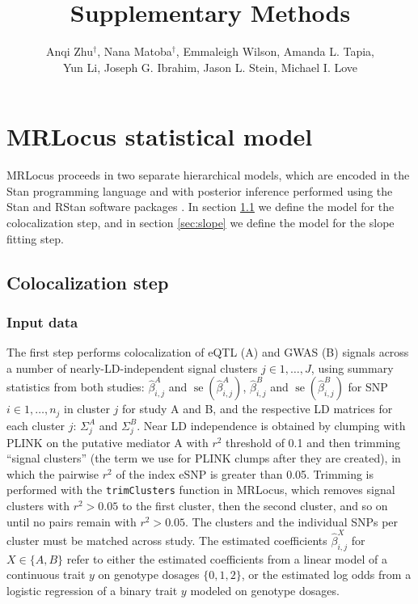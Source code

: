 \documentclass[11pt]{article}
\title{Supplementary Methods}
\author{Anqi Zhu$^\dagger$, Nana Matoba$^\dagger$, Emmaleigh Wilson, Amanda L. Tapia,
  \\ Yun Li, Joseph G. Ibrahim, Jason L. Stein, Michael I. Love}
\DeclareMathOperator{\se}{\textrm{se}}
\begin{document}
\maketitle
\section{MRLocus statistical model}

MRLocus proceeds in two separate hierarchical models, which are
encoded in the Stan programming language and with posterior
inference performed using the Stan and RStan software packages
\citep{stan,rstan}. In section \ref{sec:coloc} we define the
model for the colocalization step, and in section \ref{sec:slope} we
define the model for the slope fitting step.

\subsection{Colocalization step} \label{sec:coloc}

\subsubsection{Input data} \label{sec:input}

The first step performs colocalization of eQTL (A) and GWAS (B)
signals across a number of nearly-LD-independent signal clusters
$j \in 1,\dots,J$, using summary statistics from both studies:
$\widehat{\beta}^A_{i,j}$ and $\se(\widehat{\beta}^A_{i,j})$,
$\widehat{\beta}^B_{i,j}$ and $\se(\widehat{\beta}^B_{i,j})$
for SNP $i \in 1,\dots,n_j$ in cluster $j$ for study A and B,
and the respective LD matrices for each cluster $j$:
$\Sigma_j^A$ and $\Sigma_j^B$.
Near LD independence is obtained by clumping with PLINK \citep{plink} on the
putative mediator A with $r^2$ threshold of 0.1 and then trimming
``signal clusters'' (the term we use for PLINK clumps after they
are created), in which the pairwise $r^2$ of the index eSNP is greater than
0.05. Trimming is performed with the \texttt{trimClusters} function in
MRLocus, which removes signal clusters with $r^2 > 0.05$ to the first
cluster, then the second cluster, and so on until no pairs remain with
$r^2 > 0.05$.
The clusters and the individual SNPs per cluster must be matched
across study.
The estimated coefficients $\widehat{\beta}^X_{i,j}$ for
$X \in \{A,B\}$ refer to either the estimated coefficients from a
linear model of a continuous trait $y$ on genotype dosages
$\{0,1,2\}$, or the estimated log odds from a logistic regression of a
binary trait $y$ modeled on genotype dosages.
\end{document}
